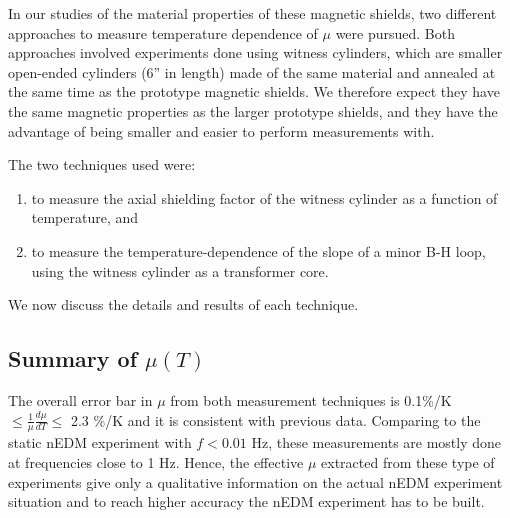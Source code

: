 \documentclass[review]{elsarticle}
\begin{document}

In our studies of the material properties of these magnetic shields,
two different approaches to measure temperature dependence of $\mu$
were pursued.  Both approaches involved experiments done using witness
cylinders, which are smaller open-ended cylinders (6'' in length) made
of the same material and annealed at the same time as the prototype
magnetic shields.  We therefore expect they have the same magnetic
properties as the larger prototype shields, and they have the
advantage of being smaller and easier to perform measurements with.



%
%

The two techniques used were:
\begin{enumerate}
\item to measure the axial shielding factor of the witness cylinder as
  a function of temperature, and
\item to measure the temperature-dependence of the slope of a minor
  B-H loop, using the witness cylinder as a transformer core.
\end{enumerate}
We now discuss the details and results of each technique.







\subsection{Summary of $\mu(T)$}
The overall error bar in $\mu$ from both measurement techniques is 0.1\%/K $\leq \frac{1}{\mu}\frac{d\mu}{dT} \leq$ 2.3 \%/K and it is consistent with previous data.
Comparing to the static nEDM experiment with $f < 0.01$ Hz, these measurements are mostly done at frequencies close to 1 Hz. Hence, the effective $\mu$ extracted from these type of experiments give
only a qualitative information on the actual nEDM experiment situation and to reach higher accuracy the nEDM experiment has to be built. 
\end{document}

